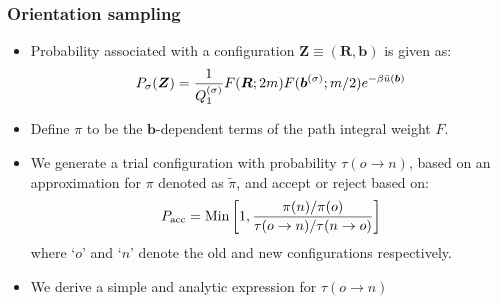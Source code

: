 \documentclass[xcolor=svgnames]{beamer}
\DeclareRobustCommand{\mbf}[1]{{\boldsymbol {#1}}}
\begin{document}
        \fi
        \begin{frame}
            \frametitle{Orientation sampling}
            \begin{itemize}
                \item Probability associated with a configuration $\mbf{Z} \equiv (\mbf{R},\mbf{b})$ is given as:
                \begin{equation*}
                \label{eq:PIProb}
                    P_\sigma (\mbf{Z}) = \frac{1}{Q_1^{{\rm (\sigma)}}} F(\mbf{R};2m) F(\mbf{b}^{(\sigma)};m/2) e^{ - \beta \bar u(\mbf{b})}
                \end{equation*}
                \item Define $\pi$ to be the $\mbf{b}$-dependent terms of the path integral weight $F$.
                \item We generate a trial configuration with probability $\tau (o \to n)$, based on an approximation for $\pi$ denoted as $\tilde \pi$, and accept or reject based on:
                \begin{equation*}
                    \label{eq:Pacc}
                    P_{\rm acc} = \text{Min} \left[1, \frac{\pi(n)/\pi(o)}{\tau (o \to n)/\tau (n \to o)} \right]
                \end{equation*}
                where `$o$' and `$n$' denote the old and new configurations respectively.
                \item We derive a simple and analytic expression for $\tau (o \to n)$
            \end{itemize}
        \end{frame}
\end{document}
